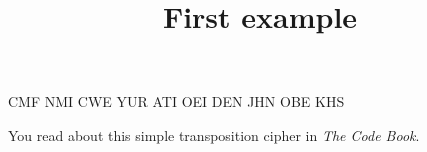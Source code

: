 \documentclass{ximera}
\title{First example}
\begin{document}
\begin{abstract} {}
\end{abstract}
\maketitle
\begin{exercise}
CMF NMI CWE YUR ATI OEI DEN JHN OBE KHS 
\begin{hint} You read about this simple transposition cipher in \textit{The Code Book}.
\end{hint}
\end{exercise}
\end{document}
